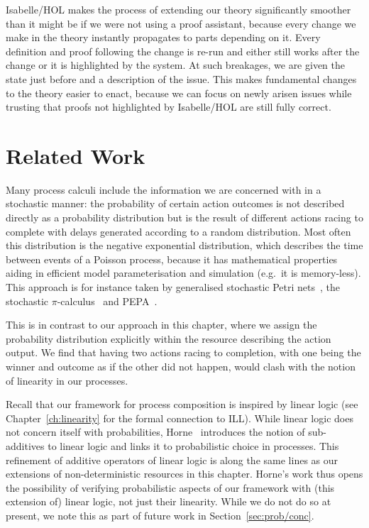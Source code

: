 \documentclass[class=smolathesis,crop=false]{standalone}
\begin{document}
Isabelle/HOL makes the process of extending our theory significantly smoother than it might be if we were not using a proof assistant, because every change we make in the theory instantly propagates to parts depending on it.
Every definition and proof following the change is re-run and either still works after the change or it is highlighted by the system.
At such breakages, we are given the state just before and a description of the issue.
This makes fundamental changes to the theory easier to enact, because we can focus on newly arisen issues while trusting that proofs not highlighted by Isabelle/HOL are still fully correct.

\section{Related Work}
\label{sec:prob/related}

Many process calculi include the information we are concerned with in a stochastic manner: the probability of certain action outcomes is not described directly as a probability distribution but is the result of different actions racing to complete with delays generated according to a random distribution.
Most often this distribution is the negative exponential distribution, which describes the time between events of a Poisson process, because it has mathematical properties aiding in efficient model parameterisation and simulation (e.g.\ it is memory-less).
This approach is for instance taken by generalised stochastic Petri nets~\cite{murata-1989}, the stochastic $\pi$-calculus~\cite{milner-1993} and PEPA~\cite{hillston-1996}.

This is in contrast to our approach in this chapter, where we assign the probability distribution explicitly within the resource describing the action output.
We find that having two actions racing to completion, with one being the winner and outcome as if the other did not happen, would clash with the notion of linearity in our processes.

Recall that our framework for process composition is inspired by linear logic (see Chapter~\ref{ch:linearity} for the formal connection to ILL).
While linear logic does not concern itself with probabilities, Horne~\cite{horne-2019} introduces the notion of sub-additives to linear logic and links it to probabilistic choice in processes.
This refinement of additive operators of linear logic is along the same lines as our extensions of non-deterministic resources in this chapter.
Horne's work thus opens the possibility of verifying probabilistic aspects of our framework with (this extension of) linear logic, not just their linearity.
While we do not do so at present, we note this as part of future work in Section~\ref{sec:prob/conc}.
\end{document}
